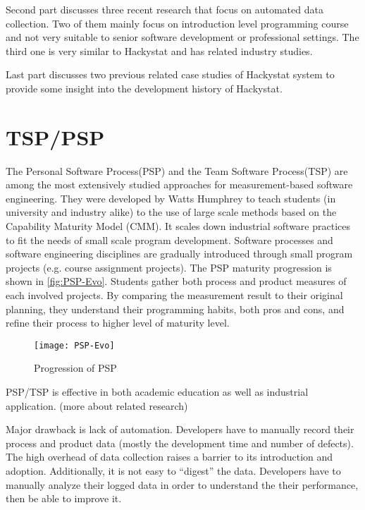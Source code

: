 Second part discusses three recent research that focus on automated data collection. Two of them mainly focus on introduction level programming course and not very suitable to senior software development or professional settings. The third one is very similar to Hackystat and has related industry studies.


Last part discusses two previous related case studies of Hackystat system to provide some insight into the development history of Hackystat.

\section {TSP/PSP}
The Personal Software Process(PSP)\cite{book:psp} and the Team Software Process(TSP)\cite{book:tsp} are among the most extensively studied approaches for measurement-based software engineering. They were developed by Watts Humphrey to teach students (in university and industry alike) to the use of large scale methods based on the Capability Maturity Model (CMM). It scales down industrial software practices to fit the needs of small scale program development. Software processes and software engineering disciplines are gradually introduced through small program projects (e.g. course assignment projects). The PSP maturity progression is shown in \autoref{fig:PSP-Evo}. Students gather both process and product measures of each involved projects. By comparing the measurement result to their original planning, they understand their programming habits, both pros and cons, and refine their process to higher level of maturity level.

\begin{figure}[htbp] %
   \centering
   \texttt{[image: PSP-Evo]} 
   \caption{Progression of PSP}
   \label{fig:PSP-Evo}
\end{figure}

PSP/TSP is effective in both academic education as well as industrial application. (more about related research)

Major drawback is lack of automation. Developers have to manually record their process and product data (mostly the development time and number of defects). The high overhead of data collection raises a barrier to its introduction and adoption. Additionally, it is not easy to ``digest'' the data. Developers have to manually analyze their logged data in order to understand the their performance, then be able to improve it.

